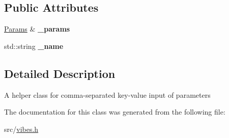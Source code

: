 \subsection*{Public Attributes}
\begin{DoxyCompactItemize}
\item 
\mbox{\label{classvibes_1_1_params_1_1_name_helper_a51807af02cb9410b564991c733ed1acf}} 
\hyperlink{classvibes_1_1_params}{Params} \& {\bfseries \+\_\+params}
\item 
\mbox{\label{classvibes_1_1_params_1_1_name_helper_ad0bba0f6f01bee6936b6cdd05e96b17e}} 
std\+::string {\bfseries \+\_\+name}
\end{DoxyCompactItemize}


\subsection{Detailed Description}
A helper class for comma-\/separated key-\/value input of parameters 

The documentation for this class was generated from the following file\+:\begin{DoxyCompactItemize}
\item 
src/\hyperlink{vibes_8h}{vibes.\+h}\end{DoxyCompactItemize}
